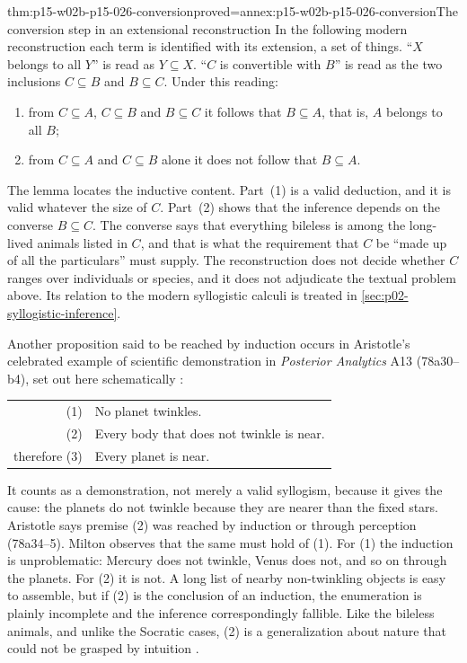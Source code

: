 \begin{hblemma}{thm:p15-w02b-p15-026-conversion}{proved=annex:p15-w02b-p15-026-conversion}{The conversion step in an extensional reconstruction}
In the following modern reconstruction each term is identified with
its extension, a set of things. ``$X$ belongs to all $Y$'' is read as
$Y\subseteq X$. ``$C$ is convertible with $B$'' is read as the two
inclusions $C\subseteq B$ and $B\subseteq C$. Under this reading:
\begin{enumerate}
\item from $C\subseteq A$, $C\subseteq B$ and $B\subseteq C$ it follows that
  $B\subseteq A$, that is, $A$ belongs to all $B$;
\item from $C\subseteq A$ and $C\subseteq B$ alone it does not follow that
  $B\subseteq A$.
\end{enumerate}
\end{hblemma}

The lemma locates the inductive content. Part~(1) is a valid deduction, and
it is valid whatever the size of $C$. Part~(2) shows that the inference
depends on the converse $B\subseteq C$. The converse says that everything
bileless is among the long-lived animals listed in $C$, and that is what
the requirement that $C$ be ``made up of all the particulars'' must
supply. The reconstruction does not decide whether $C$ ranges over
individuals or species, and it does not adjudicate the textual problem
above. Its relation to the modern syllogistic calculi is treated in
\cref{sec:p02-syllogistic-inference}.

Another proposition said to be reached by induction occurs in Aristotle's
celebrated example of scientific demonstration in \emph{Posterior Analytics}
A13 (78a30--b4), set out here schematically
\cite[p.~5]{Milton2011InductionBeforeHume}:
\begin{center}
\begin{tabular}{rl}
(1) & No planet twinkles.\\
(2) & Every body that does not twinkle is near.\\
therefore (3) & Every planet is near.
\end{tabular}
\end{center}
It counts as a demonstration, not merely a valid syllogism, because it
gives the cause: the planets do not twinkle because they are nearer than
the fixed stars. Aristotle says premise (2) was reached by induction or
through perception (78a34--5). Milton observes that the same must hold of
(1). For (1) the induction is unproblematic: Mercury does not twinkle,
Venus does not, and so on through the planets. For (2) it is not. A long
list of nearby non-twinkling objects is easy to assemble, but if (2) is the
conclusion of an induction, the enumeration is plainly incomplete and the
inference correspondingly fallible. Like the bileless animals, and unlike
the Socratic cases, (2) is a generalization about nature that could not be
grasped by intuition \cite[p.~5]{Milton2011InductionBeforeHume}.

